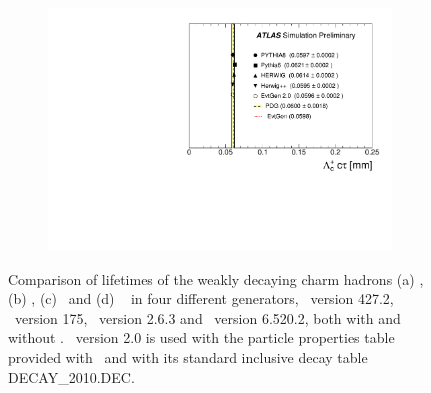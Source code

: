 \begin{figure}
\begin{subfigure}[]{0.45\textwidth}
\end{subfigure}
\begin{subfigure}[]{0.45\textwidth}
\includegraphics[width=\textwidth]{evtgen/figures/EvtGen/h_Lambdac_life.pdf}
\end{subfigure}
\caption{Comparison of lifetimes of the weakly decaying charm hadrons 
(a) \Dzero, (b) \Dplus, (c) \Ds\ and (d) \Lc~
in four different generators,
\Pythia\ version 427.2, \PythiaE\ version 175, \Herwigpp\  version 2.6.3 and \Herwig\ version 6.520.2, 
both with and without
\EvtGen.  
\EvtGen\ version 2.0 is used with the particle properties table provided with \EvtGen\ and with 
its standard inclusive decay table DECAY\_2010.DEC.
}
\label{fig:clife}
\end{figure}


